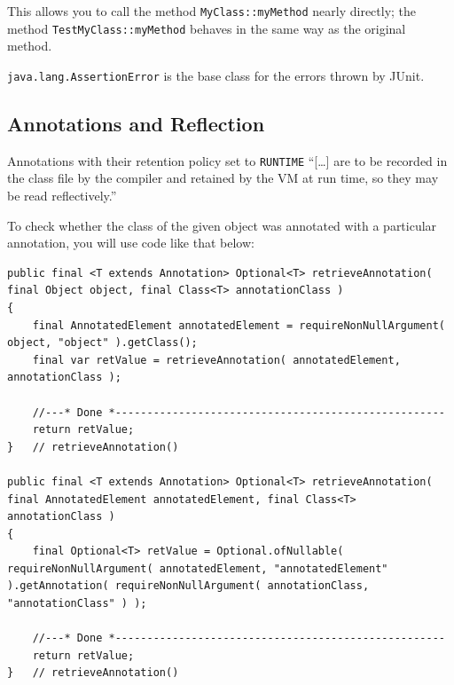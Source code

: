 This allows you to call the method \lstinline|MyClass::myMethod| nearly directly; the method \lstinline|TestMyClass::myMethod| behaves in the same way as the original method.

\lstinline|java.lang.AssertionError|\autocite{ORACLE_DOC_ASSERTIONERROR_CLASS} is the base class for the errors thrown by JUnit\autocite{JUNIT5}.


\subsection{Annotations and Reflection}
Annotations with their retention policy\autocite{ORACLE_DOC_RETENTIONPOLICY_CLASS,ORACLE_DOC_RETENTION_INTERFACE} set to \verb#RUNTIME#  “[…] are to be recorded in the class file by the compiler and retained by the VM at run time, so they may be read reflectively.”

To check whether the class of the given object was annotated with a particular annotation, you will use code like that below:
\begin{lstlisting}
public final <T extends Annotation> Optional<T> retrieveAnnotation( final Object object, final Class<T> annotationClass )
{
    final AnnotatedElement annotatedElement = requireNonNullArgument( object, "object" ).getClass(); 
    final var retValue = retrieveAnnotation( annotatedElement, annotationClass );
		
    //---* Done *----------------------------------------------------
    return retValue;
}   // retrieveAnnotation()

public final <T extends Annotation> Optional<T> retrieveAnnotation( final AnnotatedElement annotatedElement, final Class<T> annotationClass )
{
    final Optional<T> retValue = Optional.ofNullable( requireNonNullArgument( annotatedElement, "annotatedElement" ).getAnnotation( requireNonNullArgument( annotationClass, "annotationClass" ) );
	
    //---* Done *----------------------------------------------------
    return retValue;
}   // retrieveAnnotation()
\end{lstlisting}

